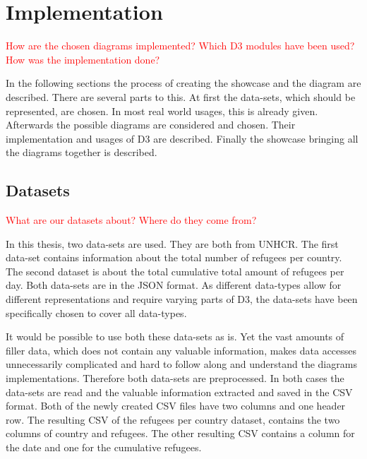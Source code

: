 \chapter{Implementation}
\textcolor{red}{
How are the chosen diagrams implemented? Which D3 modules have been used? How was the implementation done?}

In the following sections the process of creating the showcase and the diagram are described. There are several parts to this. At first the data-sets, which should be represented, are chosen. In most real world usages, this is already given. Afterwards the possible diagrams are considered and chosen. Their implementation and usages of D3 are described. Finally the showcase bringing all the diagrams together is described.

\section{Datasets}
\textcolor{red}{
What are our datasets about? Where do they come from?}

In this thesis, two data-sets are used. They are both from UNHCR\cite{unhcr}. The first data-set contains information about the total number of refugees per country\cite{unhcr_rpc}. The second dataset is about the total cumulative total amount of refugees per day\cite{unhcr_rpd}. Both data-sets are in the JSON format.
As different data-types allow for different representations and require varying parts of D3, the data-sets have been specifically chosen to cover all data-types.


It would be possible to use both these data-sets as is. Yet the vast amounts of filler data, which does not contain any valuable information, makes data accesses unnecessarily complicated and hard to follow along and understand the diagrams implementations. Therefore both data-sets are preprocessed. In both cases the data-sets are read and the valuable information extracted and saved in the CSV format. Both of the newly created CSV files have two columns and one header row. The resulting CSV of the refugees per country dataset, contains the two columns of country and refugees. The other resulting CSV contains a column for the date and one for the cumulative refugees. 

